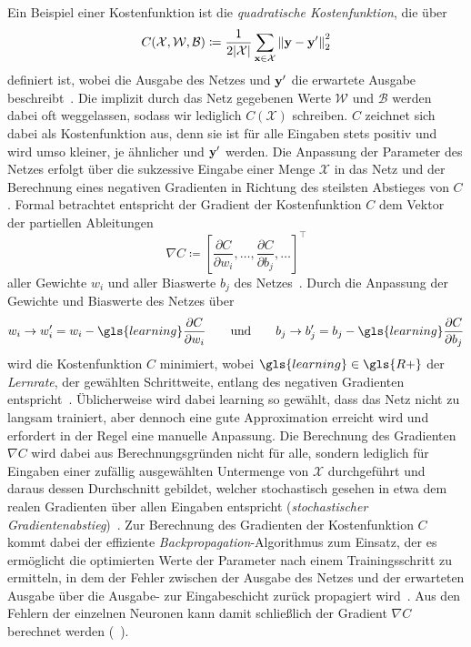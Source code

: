 Ein Beispiel einer Kostenfunktion ist die \emph{quadratische Kostenfunktion}, die über
\begin{equation}
  C\left(\mathcal{X}, \mathcal{W}, \mathcal{B}\right) \coloneqq \frac{1}{2\left|\mathcal{X}\right|} \sum_{\ve{x} \in \mathcal{X}} {\left\| \ve{y} - \ve{y}^{\prime} \right\|}_2^2
  \label{eq:quadratische_kostenfunktion}
\end{equation}
definiert ist, wobei  die Ausgabe des Netzes und $\mathbf{y}^{\prime}$ die erwartete Ausgabe \bzgl{}  beschreibt~\cite{Nielsen}.
Die implizit durch das Netz gegebenen Werte $\mathcal{W}$ und $\mathcal{B}$ werden dabei oft weggelassen, sodass wir lediglich $C\left(\mathcal{X}\right)$ schreiben.
$C$ zeichnet sich dabei als Kostenfunktion aus, denn sie ist für alle Eingaben stets positiv und wird umso kleiner, je ähnlicher  und $\mathbf{y}^{\prime}$ werden.
Die Anpassung der Parameter des Netzes erfolgt über die sukzessive Eingabe einer Menge $\mathcal{X}$ in das Netz und der Berechnung eines negativen Gradienten in Richtung des steilsten Abstieges von $C$.
Formal betrachtet entspricht der Gradient der Kostenfunktion $C$ dem Vektor der partiellen Ableitungen
\begin{equation*}
  \nabla C \coloneqq {\left[\frac{\partial C}{\partial w_i}, \ldots, \frac{\partial C}{\partial b_j}, \ldots \right]}^{\top}
\end{equation*}
aller Gewichte $w_i$ und aller Biaswerte $b_j$ des Netzes~\cite{Nielsen}.
Durch die Anpassung der Gewichte und Biaswerte des Netzes über
\begin{equation*}
  w_i \rightarrow w^{\prime}_i = w_i - \gls{learning}\frac{\partial C}{\partial w_i}
  \qquad
  \text{und}
  \qquad
  b_j \rightarrow b^{\prime}_j = b_j - \gls{learning}\frac{\partial C}{\partial b_j}
\end{equation*}
wird die Kostenfunktion $C$ minimiert, wobei $\gls{learning} \in \gls{R+}$ der \emph{Lernrate}, \dhe{} der gewählten Schrittweite, entlang des negativen Gradienten entspricht~\cite{Nielsen}.
Üblicherweise wird dabei \gls{learning} so gewählt, dass das Netz nicht zu langsam trainiert, aber dennoch eine gute Approximation erreicht wird und erfordert in der Regel eine manuelle Anpassung.
Die Berechnung des Gradienten $\nabla C$ wird dabei aus Berechnungsgründen nicht für alle, sondern lediglich für Eingaben einer zufällig ausgewählten Untermenge von $\mathcal{X}$ durchgeführt und daraus dessen Durchschnitt gebildet, welcher stochastisch gesehen in etwa dem realen Gradienten über allen Eingaben entspricht (\emph{stochastischer Gradientenabstieg})~\cite{Nielsen}.
Zur Berechnung des Gradienten der Kostenfunktion $C$ kommt dabei der effiziente \emph{Backpropagation}-Algorithmus zum Einsatz, der es ermöglicht die optimierten Werte der Parameter nach einem Trainingsschritt zu ermitteln, in dem der Fehler zwischen der Ausgabe des Netzes und der erwarteten Ausgabe über die Ausgabe- zur Eingabeschicht zurück propagiert wird~\cite{backpropagation}.
Aus den Fehlern der einzelnen Neuronen kann damit schließlich der Gradient $\nabla C$ berechnet werden (\vgl{}~\cite{Nielsen}).

